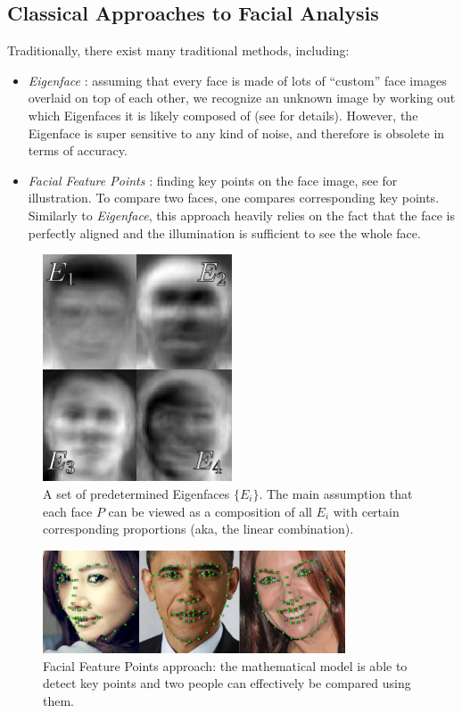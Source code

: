 \documentclass[a4, 14pt]{extarticle}
\begin{document}
\subsection{Classical Approaches to Facial Analysis}\label{ai:classical}
Traditionally, there exist many traditional methods, including:
\begin{itemize}
    \item \textit{Eigenface} \cite{eigenface}: assuming that every face is made of lots of ``custom'' face images overlaid on top of each other, we recognize an unknown image by working out which Eigenfaces it is likely composed of (see  for details). However, the Eigenface is super sensitive to any kind of noise, and therefore is obsolete in terms of accuracy.
    \item \textit{Facial Feature Points} \cite{wang2014facial}: finding key points on the face image, see  for illustration. To compare two faces, one compares corresponding key points. Similarly to \textit{Eigenface}, this approach heavily relies on the fact that the face is perfectly aligned and the illumination is sufficient to see the whole face.
\end{itemize}

\begin{figure}
    \centering
    \includegraphics[width=0.5\textwidth]{images/eigenface.png}
    \caption{A set of predetermined Eigenfaces $\{E_i\}$. The main assumption that each face $P$ can be viewed as a composition of all $E_i$ with certain corresponding proportions (aka, the linear combination).}
    \label{fig:eigenface}
\end{figure}

\begin{figure}
    \centering
    \includegraphics[width=0.8\textwidth]{images/face_features.png}
    \caption{Facial Feature Points approach: the mathematical model is able to detect key points and two people can effectively be compared using them.}
    \label{fig:face-features}
\end{figure}
\end{document}
